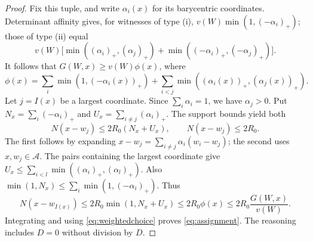 \begin{proof}
Fix this tuple, and write $\alpha_i(x)$ for its barycentric coordinates.
Determinant affinity gives, for witnesses of type (i),
$v(W)\min(1,(-\alpha_i)_+)$; those of type (ii) equal
\[
 v(W)\bigl[\min((\alpha_i)_+,(\alpha_j)_+)
           +\min((-\alpha_i)_+,(-\alpha_j)_+)\bigr].
\]
It follows that $G(W,x)\ge v(W)\phi(x)$, where
\[
 \phi(x)=\sum_i\min(1,(-\alpha_i(x))_+)
       +\sum_{i<j}\min((\alpha_i(x))_+,(\alpha_j(x))_+).
\]
Let $j=I(x)$ be a largest coordinate. Since $\sum_i\alpha_i=1$, we have
$\alpha_j>0$. Put $N_x=\sum_i(-\alpha_i)_+$ and
$U_x=\sum_{i\ne j}(\alpha_i)_+$. The support bounds yield both
\[
 N(x-w_j)\le2R_0(N_x+U_x),\qquad N(x-w_j)\le2R_0.
\]
The first follows by expanding $x-w_j=\sum_{i\ne j}\alpha_i(w_i-w_j)$;
the second uses $x,w_j\in\mathcal A$. The pairs containing the largest
coordinate give $U_x\le\sum_{i<l}\min((\alpha_i)_+,(\alpha_l)_+)$.
Also $\min(1,N_x)\le\sum_i\min(1,(-\alpha_i)_+)$. Thus
\[
 N(x-w_{I(x)})\le2R_0\min(1,N_x+U_x)
 \le2R_0\phi(x)\le2R_0\frac{G(W,x)}{v(W)}.
\]
Integrating and using \eqref{eq:weightedchoice} proves \eqref{eq:assignment}.
The reasoning includes $D=0$ without division by $D$.
\end{proof}

